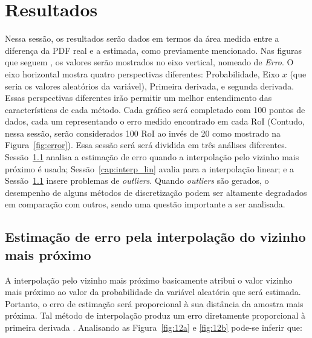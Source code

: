 \chapter{Resultados} \label{cap:resultados}

Nessa sessão, os resultados serão dados em termos da área medida entre a diferença da \ac{PDF} real e a estimada, como previamente mencionado. Nas figuras que seguem , os valores serão mostrados no eixo vertical, nomeado de \textit{Erro}. O eixo horizontal mostra quatro perspectivas diferentes: Probabilidade, Eixo $ x $ (que seria os valores aleatórios da variável), Primeira derivada, e segunda derivada. Essas perspectivas diferentes irão permitir um melhor entendimento das características de cada método. Cada gráfico será completado com 100 pontos de dados, cada um representando o erro medido encontrado em cada \ac{RoI} (Contudo, nessa sessão, serão considerados 100 \ac{RoI} ao invés de 20 como mostrado na Figura~\ref{fig:error}). Essa sessão será será dividida em três análises diferentes. Sessão~\ref{cap:interp_neares} analisa a estimação de erro quando a interpolação pelo vizinho mais próximo é usada; Sessão~\ref{cap:interp_lin} avalia para a interpolação linear; e a Sessão~\ref{cap:interp_neares} insere problemas de \textit{outliers}. Quando \textit{outliers} são gerados, o desempenho de alguns métodos de discretização podem ser altamente degradados em comparação com outros, sendo uma questão importante a ser analisada.

\section{Estimação de erro pela interpolação do vizinho mais próximo} \label{cap:interp_neares}
A interpolação pelo vizinho mais próximo basicamente atribui o valor vizinho mais próximo ao valor da probabilidade da variável aleatória que será estimada. Portanto, o erro de estimação será proporcional à sua distância da amostra mais próxima. Tal método de interpolação produz um erro diretamente proporcional à primeira derivada \cite{gurevich1966integral}. Analisando as Figura~\ref{fig:12a} e \ref{fig:12b} pode-se inferir que: 

